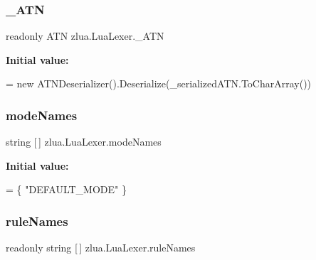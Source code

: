 \subsubsection{\texorpdfstring{\+\_\+\+A\+TN}{\_ATN}}
{\footnotesize\ttfamily readonly A\+TN zlua.\+Lua\+Lexer.\+\_\+\+A\+TN\hspace{0.3cm}{\ttfamily [static]}}

{\bfseries Initial value\+:}
\begin{DoxyCode}
=
        \textcolor{keyword}{new} ATNDeserializer().Deserialize(\_serializedATN.ToCharArray())
\end{DoxyCode}
\mbox{\label{classzlua_1_1_lua_lexer_a3309cd40f28ea734a9ea20a3d6ed714e}} 
\subsubsection{\texorpdfstring{mode\+Names}{modeNames}}
{\footnotesize\ttfamily string \mbox{[}$\,$\mbox{]} zlua.\+Lua\+Lexer.\+mode\+Names\hspace{0.3cm}{\ttfamily [static]}}

{\bfseries Initial value\+:}
\begin{DoxyCode}
= \{
        \textcolor{stringliteral}{"DEFAULT\_MODE"}
    \}
\end{DoxyCode}
\mbox{\label{classzlua_1_1_lua_lexer_ae00bf2edfb1f685963bfd32c370e6676}} 
\subsubsection{\texorpdfstring{rule\+Names}{ruleNames}}
{\footnotesize\ttfamily readonly string \mbox{[}$\,$\mbox{]} zlua.\+Lua\+Lexer.\+rule\+Names\hspace{0.3cm}{\ttfamily [static]}}


